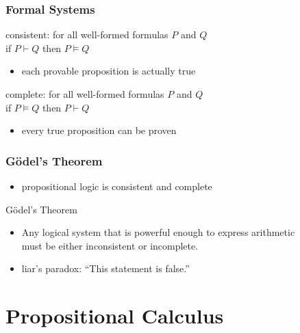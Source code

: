 \documentclass[dvipsnames]{beamer}
\begin{document}
\begin{frame}
  \frametitle{Formal Systems}

  \begin{definition}
    \alert{consistent}: for all well-formed formulas $P$ and $Q$\\
      if $P \vdash Q$ then $P \vDash Q$

    \begin{itemize}
      \item each provable proposition is actually true
    \end{itemize}
  \end{definition}

  \pause
  \begin{definition}
    \alert{complete}: for all well-formed formulas $P$ and $Q$\\
      if $P \vDash Q$ then $P \vdash Q$
    \begin{itemize}
      \item every true proposition can be proven
    \end{itemize}
  \end{definition}
\end{frame}

\begin{frame}
  \frametitle{Gödel's Theorem}

  \begin{itemize}
    \item propositional logic is consistent and complete
  \end{itemize}

  \pause
  \begin{block}{Gödel's Theorem}
    \begin{itemize}
      \item Any logical system that is powerful enough to express arithmetic\\
        must be either inconsistent or incomplete.
    \end{itemize}
  \end{block}

  \pause
  \medskip
  \begin{itemize}
    \item liar's paradox: ``This statement is false.''
  \end{itemize}
\end{frame}

\section{Propositional Calculus}
\end{document}
